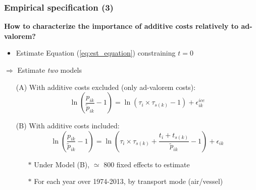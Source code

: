 \documentclass[10 pt,Helvetica, french]{beamer}
\begin{document}
\begin{frame}
\frametitle{Empirical specification (3)}
\textbf{How to characterize the importance of additive costs relatively to ad-valorem?} \vspace{0.1cm}
\pause
\begin{itemize}
\item Estimate Equation (\ref{eq:est_equation}) constraining $t=0$ \vspace{0.1cm}
\end{itemize}
$\Rightarrow$ Estimate \textit{two} models\vspace{0.1cm}
\begin{itemize}
\item[(A)] With additive costs excluded (only ad-valorem costs):
\footnotesize
\begin{equation}
\ln\left(\frac{p_{ik}}{\widetilde{p}_{ik}}-1 \right)= \ln \left(\tau_{i} \times \tau_{s(k)}-1 \right) + \epsilon^{ice}_{ik} \label{eq:model_nlI}
\end{equation}
\normalsize
\item[(B)] With additive costs included:
\footnotesize
\begin{equation}
\ln\left(\frac{p_{ik}}{\widetilde{p}_{ik}}-1 \right)= \ln \left(\tau_{i} \times \tau_{s(k)}+\frac{t_{i} + t_{s(k)}}{\widetilde{p}_{ik}}-1 \right) + \epsilon_{ik} \label{eq:est_equation}
\end{equation}
\normalsize
\begin{itemize}
\item[$\ast$] Under Model (B), $\simeq$ 800 fixed effects to estimate  \vspace{0.1cm}
\item[$\ast$] For each year over 1974-2013, by transport mode (air/vessel)
\end{itemize}
\end{itemize}
\end{frame}

\end{document}
